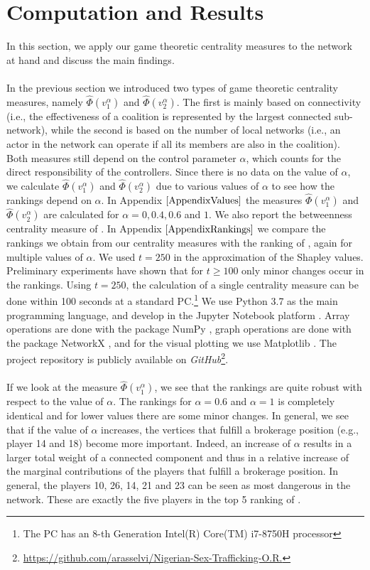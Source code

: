 \documentclass[10p]{article}
\theoremstyle{definition}
\theoremstyle{definition}
\begin{document}
\section{Computation and Results}
In this section, we apply our game theoretic centrality measures to the network at hand and discuss the main findings. \\ \\
In the previous section we introduced two types of game theoretic centrality measures, namely $\hat{\Phi}(v_1^\alpha)$ and $\hat{\Phi}(v_2^\alpha)$. The first is mainly based on connectivity (i.e., the effectiveness of a coalition is represented by the largest connected sub-network), while the second is based on the number of local networks (i.e., an actor in the network can operate if all its members are also in the coalition). Both measures still depend on the control parameter $\alpha$, which counts for the direct responsibility of the controllers. Since there is no data on the value of $\alpha$, we calculate $\hat{\Phi}(v_1^\alpha)$ and $\hat{\Phi}(v_2^\alpha)$ due to various values of $\alpha$ to see how the rankings depend on $\alpha$. In Appendix $\ref{AppendixValues}$ the measures $\hat{\Phi}(v_1^\alpha)$ and $\hat{\Phi}(v_2^\alpha)$ are calculated for $\alpha = 0, 0.4, 0.6$ and $1$. We also report the betweenness centrality measure of \cite{mancuso2014not}. In Appendix $\ref{AppendixRankings}$ we compare the rankings we obtain from our centrality measures with the ranking of \cite{mancuso2014not}, again for multiple values of $\alpha$. We used $t = 250$ in the approximation of the Shapley values. Preliminary experiments have shown that for $t \geq 100$ only minor changes occur in the rankings. Using $t = 250$, the calculation of a single centrality measure can be done within 100 seconds at a standard PC.\footnote{The PC has an 8-th Generation Intel(R) Core(TM) i7-8750H processor}  We use Python 3.7 \cite{Rossum:1995:PRM:869369} as the main programming language, and develop in the Jupyter Notebook platform \cite{Kluyver:2016aa}. Array operations are done with the package NumPy \cite{numpy}, graph operations are done with the package NetworkX \cite{team2014networkx}, and for the visual plotting we use Matplotlib \cite{Hunter:2007}. The project repository is publicly available on \textit{GitHub}\footnote{\url{https://github.com/arasselvi/Nigerian-Sex-Trafficking-O.R.}}. \\ \\
If we look at the measure $\hat{\Phi}(v_1^\alpha)$, we see that the rankings are quite robust with respect to the value of $\alpha$. The rankings for $\alpha = 0.6$ and $\alpha = 1$ is completely identical and for lower values there are some minor changes. In general, we see that if the value of $\alpha$ increases, the vertices that fulfill a brokerage position (e.g., player 14 and 18) become more important. Indeed, an increase of $\alpha$ results in a larger total weight of a connected component and thus in a relative increase of the marginal contributions of the players that fulfill a brokerage position. In general, the players 10, 26, 14, 21 and 23 can be seen as most dangerous in the network. These are exactly the five players in the top 5 ranking of \cite{mancuso2014not}. 
\end{document}
